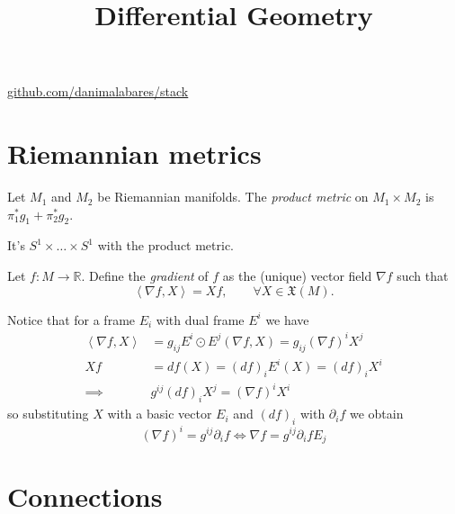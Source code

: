 



\title{Differential Geometry}
\maketitle

\label{section-phantom}
\hfill
\href{http://github.com/danimalabares/stack}{github.com/danimalabares/stack}
\tableofcontents

\section{Riemannian metrics}
\label{section-Riemannian-metrics}

\begin{definition}
\label{definition-product-metric}
Let $M_1$ and $M_2$ be Riemannian manifolds. The {\it product metric} on
$M_1\times M_2$ is $\pi_1^*g_1+\pi_2^*g_2$.
\end{definition}

\begin{example}
\label{example-flat-torus}
It's $S^1\times\ldots\times S^1$ with the product metric.
\end{example}

\begin{definition}
\label{definition-gradient}
Let  $f:M\to\mathbb{R}$. Define the {\it gradient} of $f$ as the (unique) vector
field $\nabla f$ such that
\begin{equation}
\label{equation-gradient}
\left<\nabla f,X\right>=Xf, \qquad \forall X\in\mathfrak{X}(M).
\end{equation}
\end{definition}

Notice that for a frame $E_i$ with dual frame $E^i$ we have
\begin{align*}
\left<\nabla f,X\right>&=g_{ij}E^i\odot E^j(\nabla f,X)
=g_{ij}(\nabla f)^iX^j\\
Xf&=df(X)=(df)_iE^i(X)=(df)_iX^i\\
\implies& g^{ij}(df)_iX^j=(\nabla f)^iX^i
\end{align*}
so substituting $X$ with a basic vector $E_i$ and $(df)_i$ with $\partial_if$ we
obtain
\begin{equation}
\label{equation-gradient-in-coordinates}
(\nabla f)^i=g^{ij}\partial_if \iff \nabla f=g^{ij}\partial_ifE_j
\end{equation}

\section{Connections}
\label{section-connections}

